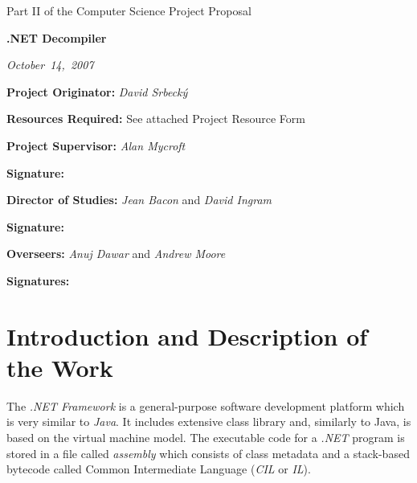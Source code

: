\documentclass[12pt]{article}
\begin{document}
\thispagestyle{empty}

\medskip
{}
\medskip
{}

\vfil

\centerline{\large Part II of the Computer Science Project Proposal}
\vspace{0.4in}
\centerline{\Large\bf .NET Decompiler}
\vspace{0.3in}
\centerline{\large\emph{October~14,~2007}}

\vfil

{\bf Project Originator:} \emph{David Srbeck\'y}

\vspace{0.1in}

{\bf Resources Required:} See attached Project Resource Form

\vspace{0.5in}

{\bf Project Supervisor:} \emph{Alan Mycroft}

\vspace{0.2in}

{\bf Signature:}

\vspace{0.5in}

{\bf Director of Studies:} \emph{Jean Bacon} and \emph{David Ingram}

\vspace{0.2in}

{\bf Signature:}

\vspace{0.5in}

{\bf Overseers:} \emph{Anuj Dawar} and \emph{Andrew Moore}

\vspace{0.2in}

{\bf Signatures:}

\vfil
\eject

\section*{Introduction and Description of the Work}
The \emph{.NET Framework} is a general-purpose software development platform 
which is very similar to \emph{Java}.  It includes extensive class library 
and, similarly to Java, is based on the virtual machine model.  The executable 
code for a \emph{.NET} program is stored in a file called \emph{assembly} 
which consists of class metadata and a stack-based bytecode called Common 
Intermediate Language (\emph{CIL} or \emph{IL}).
\end{document}
